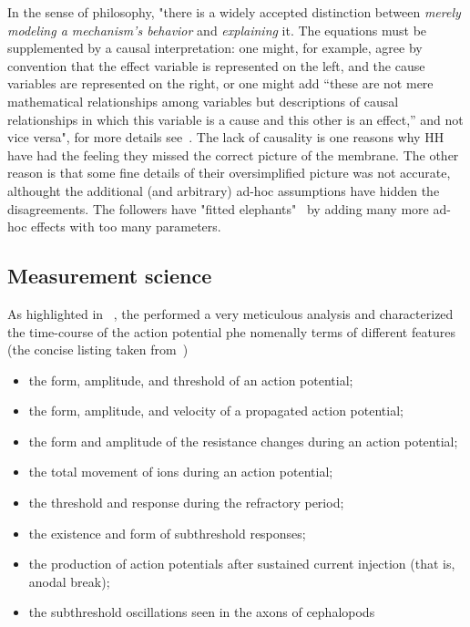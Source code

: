 In the sense of philosophy, "there is a widely accepted distinction between
\textit{merely modeling a mechanism’s behavior} and \textit{explaining} it.
The equations
must be supplemented by a causal interpretation: one might, for example, agree by
convention that the effect variable is represented on the left, and the cause variables
are represented on the right, or one might add “these are not mere mathematical
relationships among variables but descriptions of causal relationships in which this
variable is a cause and this other is an effect,” and not vice versa",
for more details see~\cite{MechanisticModelHodgkinHuxleyCraver:2006,Mechanistic_HodgkinHuxley_2008}.
The lack of causality is one reasons why
HH have had the feeling they missed the correct picture of the membrane.
The other reason is that some fine details of their oversimplified picture was not accurate,
althought the additional (and arbitrary) ad-hoc assumptions have hidden the disagreements.
The followers have "fitted elephants"~\cite{FittingElephants:2021} by adding many more ad-hoc effects with too many parameters.

\subsection{Measurement science\label{sec:Physiology-HHPhilosophy}}

As highlighted in ~\cite{MechanisticModelHodgkinHuxleyCraver:2006}, the performed a very meticulous analysis
and characterized the time-course of the action potential phe
nomenally terms of different features (the concise listing taken from~\cite{MechanisticModelHodgkinHuxleyCraver:2006})

\begin{itemize}
\item the form, amplitude, and threshold of an action potential;
\item the form, amplitude, and velocity of a propagated action potential;
\item the form and amplitude of the resistance changes during an action potential;
\item the total movement of ions during an action potential;
\item the threshold and response during the refractory period;
\item the existence and form of subthreshold responses;
\item the production of action potentials after sustained current injection (that is,
anodal break);
\item the subthreshold oscillations seen in the axons of cephalopods
\end{itemize}



